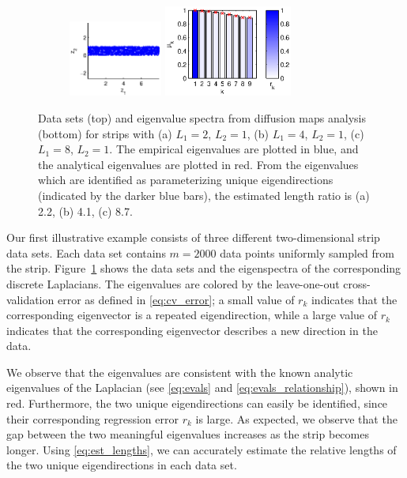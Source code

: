 \documentclass[3p]{elsarticle}
\begin{document}
\begin{figure}[!t]
\begin{subfigure}{0.25\textwidth}
\end{subfigure}
%
%
\begin{subfigure}{0.3\textwidth}
\includegraphics[height=2.5cm]{strip_data_L8}
\includegraphics[height=3cm]{strip_spectrum_L8}
\caption{}
\end{subfigure}
%
\caption{Data sets (top) and eigenvalue spectra from diffusion maps analysis (bottom) for strips with (a) $L_1 = 2$, $L_2 = 1$, (b) $L_1 = 4$, $L_2 = 1$, (c) $L_1 = 8$, $L_2 = 1$. The empirical eigenvalues are plotted in blue, and the analytical eigenvalues are plotted in red. From the eigenvalues which are identified as parameterizing unique eigendirections (indicated by the darker blue bars), the estimated length ratio is (a) 2.2, (b) 4.1, (c) 8.7.}
\label{fig:strip_compare_analytic}
\end{figure}

Our first illustrative example consists of three different two-dimensional strip data sets. 
%
Each data set contains $m=2000$ data points uniformly sampled from the strip. 
%
Figure~\ref{fig:strip_compare_analytic} shows the data sets and the eigenspectra of the corresponding discrete Laplacians.
%
The eigenvalues are colored by the leave-one-out cross-validation error as defined in \eqref{eq:cv_error}; a small value of $r_k$ indicates that the corresponding eigenvector is a repeated eigendirection, while a large value of $r_k$ indicates that the corresponding eigenvector describes a new direction in the data. 
%

We observe that the eigenvalues are consistent with the known analytic eigenvalues of the Laplacian (see \eqref{eq:evals} and \eqref{eq:evals_relationship}), shown in red.
%
Furthermore, the two unique eigendirections can easily be identified, since their corresponding regression error $r_k$ is large. 
%
As expected, we observe that the gap between the two meaningful eigenvalues increases as the strip becomes longer. 
%
Using \eqref{eq:est_lengths}, we can accurately estimate the relative lengths of the two unique eigendirections in each data set. 
\end{document}

